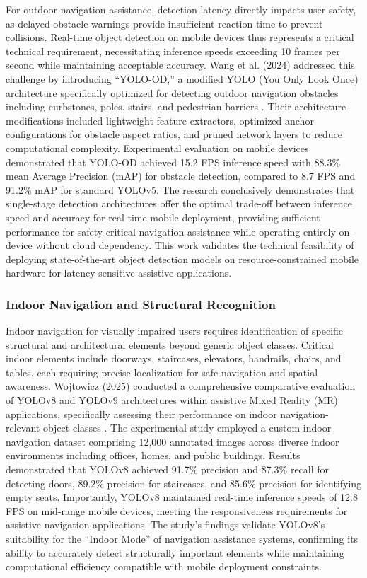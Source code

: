 \documentclass[a4paper]{report}
\begin{document}
For outdoor navigation assistance, detection latency directly impacts user safety, as delayed obstacle warnings provide insufficient reaction time to prevent collisions. Real-time object detection on mobile devices thus represents a critical technical requirement, necessitating inference speeds exceeding 10 frames per second while maintaining acceptable accuracy. Wang et al. (2024) addressed this challenge by introducing ``YOLO-OD,'' a modified YOLO (You Only Look Once) architecture specifically optimized for detecting outdoor navigation obstacles including curbstones, poles, stairs, and pedestrian barriers \cite{wang2024yolood}. Their architecture modifications included lightweight feature extractors, optimized anchor configurations for obstacle aspect ratios, and pruned network layers to reduce computational complexity. Experimental evaluation on mobile devices demonstrated that YOLO-OD achieved 15.2 FPS inference speed with 88.3\% mean Average Precision (mAP) for obstacle detection, compared to 8.7 FPS and 91.2\% mAP for standard YOLOv5. The research conclusively demonstrates that single-stage detection architectures offer the optimal trade-off between inference speed and accuracy for real-time mobile deployment, providing sufficient performance for safety-critical navigation assistance while operating entirely on-device without cloud dependency. This work validates the technical feasibility of deploying state-of-the-art object detection models on resource-constrained mobile hardware for latency-sensitive assistive applications.

\subsubsection{Indoor Navigation and Structural Recognition}

Indoor navigation for visually impaired users requires identification of specific structural and architectural elements beyond generic object classes. Critical indoor elements include doorways, staircases, elevators, handrails, chairs, and tables, each requiring precise localization for safe navigation and spatial awareness. Wojtowicz (2025) conducted a comprehensive comparative evaluation of YOLOv8 and YOLOv9 architectures within assistive Mixed Reality (MR) applications, specifically assessing their performance on indoor navigation-relevant object classes \cite{wojtowicz2025yolov8}. The experimental study employed a custom indoor navigation dataset comprising 12,000 annotated images across diverse indoor environments including offices, homes, and public buildings. Results demonstrated that YOLOv8 achieved 91.7\% precision and 87.3\% recall for detecting doors, 89.2\% precision for staircases, and 85.6\% precision for identifying empty seats. Importantly, YOLOv8 maintained real-time inference speeds of 12.8 FPS on mid-range mobile devices, meeting the responsiveness requirements for assistive navigation applications. The study's findings validate YOLOv8's suitability for the ``Indoor Mode'' of navigation assistance systems, confirming its ability to accurately detect structurally important elements while maintaining computational efficiency compatible with mobile deployment constraints.
\end{document}
